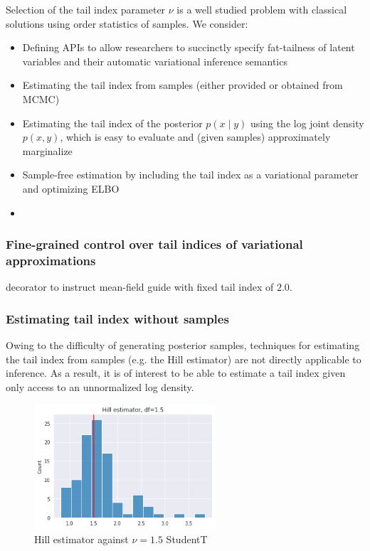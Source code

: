 \documentclass{scrartcl}
\theoremstyle{definition}
\begin{document}
Selection of the tail index parameter $\nu$ is a well studied problem with
classical solutions \citep{hill1975simple,pickands1975statistical} using
order statistics of samples. 
We consider:
\begin{itemize}
    \item Defining APIs to allow researchers to succinctly specify fat-tailness of latent
          variables and their automatic variational inference semantics
    \item Estimating the tail index from samples (either provided or obtained from MCMC)
    \item Estimating the tail index of the posterior $p(x \mid y)$ using the log joint density $p(x,y)$,
          which is easy to evaluate and (given samples) approximately marginalize
    \item Sample-free estimation by including the tail index as a variational
          parameter and optimizing ELBO
    \item {}
\end{itemize}

\subsubsection{Fine-grained control over tail indices of variational approximations}

decorator to instruct mean-field guide with fixed tail index of $2.0$.

\subsubsection{Estimating tail index without samples}



Owing to the difficulty of generating posterior samples,
techniques for estimating the tail index from samples (e.g. the Hill estimator)
are not directly applicable to inference. As a result, it is of interest
to be able to estimate a tail index given only access to an unnormalized log density.

\begin{figure}[H]
    \centering
    \includegraphics[width=0.6\textwidth]{Figures/hill.png}
    \caption{Hill estimator against $\nu=1.5$ StudentT}
    \label{fig:hill}
\end{figure}
\end{document}
